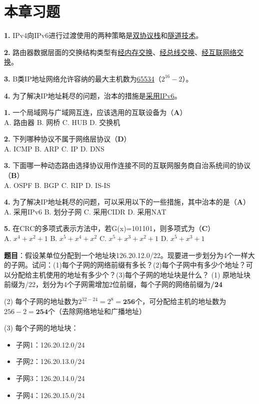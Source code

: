 \section{本章习题}

\begin{examplebox}[填空题]
\textbf{1.} IPv4向IPv6进行过渡使用的两种策略是\underline{双协议栈}和\underline{隧道技术}。

\textbf{2.} 路由器数据层面的交换结构类型有\underline{经内存交换}、\underline{经总线交换}、\underline{经互联网络交换}。

\textbf{3.} B类IP地址网络允许容纳的最大主机数为\underline{65534}（$2^{16}-2$）。

\textbf{4.} 为了解决IP地址耗尽的问题，治本的措施是\underline{采用IPv6}。
\end{examplebox}

\begin{examplebox}[选择题]
\textbf{1.} 一个局域网与广域网互连，应该选用的互联设备为（\textbf{A}）\\
A. 路由器 \quad B. 网桥 \quad C. HUB \quad D. 交换机

\textbf{2.} 下列哪种协议不属于网络层协议（\textbf{D}）\\
A. ICMP \quad B. ARP \quad C. IP \quad D. DNS

\textbf{3.} 下面哪一种动态路由选择协议用作连接不同的互联网服务商自治系统间的协议（\textbf{B}）\\
A. OSPF \quad B. BGP \quad C. RIP \quad D. IS-IS

\textbf{4.} 为了解决IP地址耗尽的问题，可以采用以下的一些措施，其中治本的是（\textbf{A}）\\
A. 采用IPv6 \quad B. 划分子网 \quad C. 采用CIDR \quad D. 采用NAT

\textbf{5.} 在CRC的多项式表示方法中，若G(x)=101101，则多项式为（\textbf{C}）\\
A. $x^4+x^2+1$ \quad B. $x^5+x^4+x^2$ \quad C. $x^5+x^3+x^2+1$ \quad D. $x^5+x^3+1$
\end{examplebox}

\begin{examplebox}
\textbf{题目}：假设某单位分配到一个地址块126.20.12.0/22。现要进一步划分为4个一样大的子网。试问：(1)每个子网的网络前缀有多长？(2)每个子网中有多少个地址？可以分配给主机使用的地址有多少个？(3)每个子网的地址块是什么？
\tcblower
(1) 原地址块前缀为/22，划分为4个子网需增加2位前缀，每个子网的网络前缀为\textbf{/24}

(2) 每个子网的地址数为$2^{32-24}=2^8=\textbf{256}$个，可分配给主机的地址数为$256-2=\textbf{254}$个（去除网络地址和广播地址）

(3) 每个子网的地址块：
\begin{itemize}[itemsep=0pt]
    \item 子网1：126.20.12.0/24
    \item 子网2：126.20.13.0/24
    \item 子网3：126.20.14.0/24
    \item 子网4：126.20.15.0/24
\end{itemize}
\end{examplebox}

